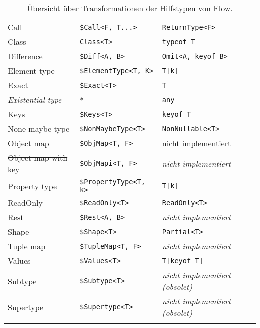 \begin{footnotesize}
\begin{longtabu} to 
  \midrule
   &  &   \\
  \midrule
  \endhead
  Call                        & \texttt{\$Call<F, T...>}        & \texttt{ReturnType<F>}        \\
  Class                       & \texttt{Class<T>}               & \texttt{typeof T}             \\
  Difference                  & \texttt{\$Diff<A, B>}           & \texttt{Omit<A, keyof B>}     \\
  Element type                & \texttt{\$ElementType<T, K>}    & \texttt{T[k]}                 \\
  Exact                       & \texttt{\$Exact<T>}             & \texttt{T}                    \\
  \textit{Existential type}   & \texttt{*}                      & \texttt{any}                  \\
  Keys                        & \texttt{\$Keys<T>}              & \texttt{keyof T}              \\
  None maybe type             & \texttt{\$NonMaybeType<T>}      & \texttt{NonNullable<T>}       \\
  \sout{Object map}           & \texttt{\$ObjMap<T, F>}         & \textmd{nicht implementiert}  \\
  \sout{Object map with key}  & \texttt{\$ObjMapi<T, F>}        & \textit{nicht implementiert}  \\
  Property type               & \texttt{\$PropertyType<T, k>}   & \texttt{T[k]}                 \\
  ReadOnly                    & \texttt{\$ReadOnly<T>}          & \texttt{ReadOnly<T>}          \\
  \sout{Rest}                 & \texttt{\$Rest<A, B>}           & \textit{nicht implementiert}  \\
  Shape                       & \texttt{\$Shape<T>}             & \texttt{Partial<T>}           \\
  \sout{Tuple map}            & \texttt{\$TupleMap<T, F>}       & \textit{nicht implementiert}  \\
  Values                      & \texttt{\$Values<T>}            & \texttt{T[keyof T]}           \\
  \sout{Subtype}              & \texttt{\$Subtype<T>}           & \textit{nicht implementiert (obsolet)} \\
  \sout{Supertype}            & \texttt{\$Supertype<T>}         & \textit{nicht implementiert (obsolet)} \\
  \midrule
  \caption{Übersicht über Transformationen der Hilfstypen von Flow.}
  \label{tab:transformation-utility-types}
\end{longtabu}
\end{footnotesize}
